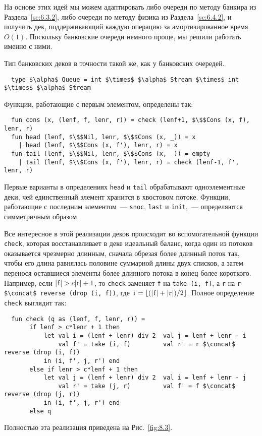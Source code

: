 На основе этих идей мы можем адаптировать либо очереди по методу
банкира из Раздела~\ref{sc:6.3.2}, либо очереди по методу физика из
Раздела~\ref{sc:6.4.2}, и получить дек, поддерживающий каждую операцию за
амортизированное время $O(1)$. Поскольку банковские очереди немного
проще, мы решили работать именно с ними.

Тип банковских деков в точности такой же, как у банковских очередей.
\begin{lstlisting}
  type $\alpha$ Queue = int $\times$ $\alpha$ Stream $\times$ int $\times$ $\alpha$ Stream
\end{lstlisting}
Функции, работающие с первым элементом, определены так:
\begin{lstlisting}
  fun cons (x, (lenf, f, lenr, r)) = check (lenf+1, $\$$Cons (x, f), lenr, r)
  fun head (lenf, $\$$Nil, lenr, $\$$Cons (x, _)) = x
    | head (lenf, $\$$Cons (x, f'), lenr, r) = x
  fun tail (lenf, $\$$Nil, lenr, $\$$Cons (x, _)) = empty
    | tail (lenf, $\\$Cons (x, f'), lenr, r) = check (lenf-1, f', lenr, r)
\end{lstlisting}
Первые варианты в определениях \lstinline!head! и \lstinline!tail!
обрабатывают одноэлементные деки, чей единственный элемент хранится в
хвостовом потоке. Функции, работающие с последним элементом~---
\lstinline!snoc!, \lstinline!last! и \lstinline!init!,~---
определяются симметричным образом.

Все интересное в этой реализации деков происходит во вспомогательной
функции \lstinline!check!, которая восстанавливает в деке идеальный
баланс, когда один из потоков оказывается чрезмерно длинным, сначала
обрезая более длинный поток так, чтобы его длина равнялась половине
суммарной длины двух списков, а затем перенося оставшиеся элементы
более длинного потока в конец более короткого. Например, если
$|\lstinline!f!| > c|\lstinline!r!| + 1$, то \lstinline!check!
заменяет \lstinline!f! на \lstinline!take (i, f)!, а \lstinline!r! на
\lstinline!r $\concat$ reverse (drop (i, f))!, где
$\lstinline!i! = \lfloor (|\lstinline!f!| + |\lstinline!r!|) /2 \rfloor$. Полное определение \lstinline!check! выглядит так:
\begin{lstlisting}
  fun check (q as (lenf, f, lenr, r)) =
       if lenf > c*lenr + 1 then
           let val i = (lenf + lenr) div 2	val j = lenf + lenr - i
               val f' = take (i, f) 		val r' = r $\concat$ reverse (drop (i, f))
           in (i, f', j, r') end
       else if lenr > c*lenf + 1 then
           let val j = (lenf + lenr) div 2	val i = lenf + lenr - j
               val r' = take (j, r)	        val f' = f $\concat$ reverse (drop (j, r))
           in (i, f', j, r') end
       else q
\end{lstlisting}
Полностью эта реализация приведена на Рис.~\ref{fig:8.3}.

